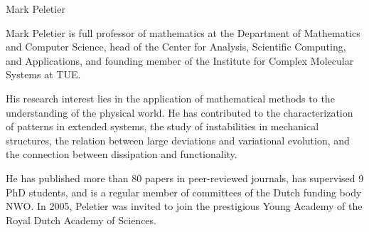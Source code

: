 \begin{participant}[type=leadPI,PM=24,gender=male,salary=5500]{Mark Peletier}


Mark Peletier is full professor of mathematics at the Department of Mathematics and Computer Science, head of the Center for Analysis, Scientific Computing, and Applications, and founding member of the Institute for Complex Molecular Systems at TUE. 

His research interest lies in the application of mathematical methods to the understanding of the physical world. He has contributed to the characterization of patterns in extended systems, the study of instabilities in mechanical structures, the relation between large deviations and variational evolution, and the connection between dissipation and functionality. 

He has published more than 80 papers in peer-reviewed journals, has supervised 9 PhD students, and is a regular member of committees of the Dutch funding body NWO. In 2005, Peletier was invited to join the prestigious Young Academy of the Royal Dutch Academy of Sciences. 

\end{participant}

